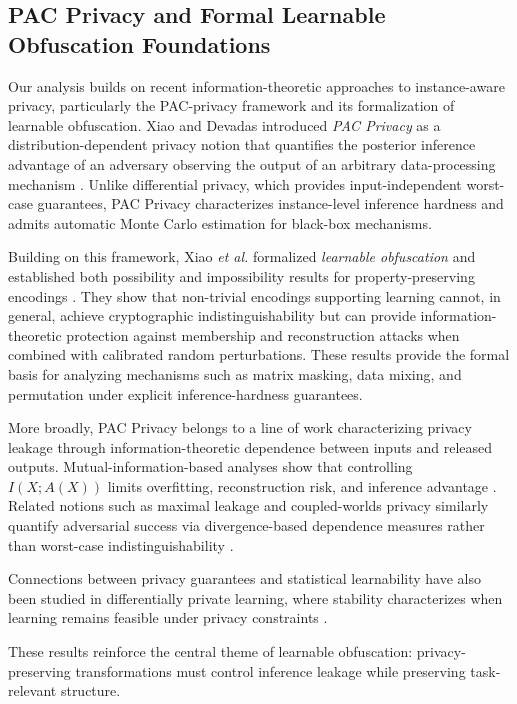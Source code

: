 \documentclass[letterpaper]{article} %
\begin{document}
\subsection{PAC Privacy and Formal Learnable Obfuscation Foundations}

Our analysis builds on recent information-theoretic approaches to instance-aware privacy, particularly the PAC-privacy framework and its formalization of learnable obfuscation. Xiao and Devadas introduced \emph{PAC Privacy} as a distribution-dependent privacy notion that quantifies the posterior inference advantage of an adversary observing the output of an arbitrary data-processing mechanism \cite{xiao2023pacprivacy}. Unlike differential privacy, which provides input-independent worst-case guarantees, PAC Privacy characterizes instance-level inference hardness and admits automatic Monte Carlo estimation for black-box mechanisms.

Building on this framework, Xiao \textit{et al.} formalized \emph{learnable obfuscation} and established both possibility and impossibility results for property-preserving encodings \cite{xiao2024formal}. They show that non-trivial encodings supporting learning cannot, in general, achieve cryptographic indistinguishability but can provide information-theoretic protection against membership and reconstruction attacks when combined with calibrated random perturbations. These results provide the formal basis for analyzing mechanisms such as matrix masking, data mixing, and permutation under explicit inference-hardness guarantees.

More broadly, PAC Privacy belongs to a line of work characterizing privacy leakage through information-theoretic dependence between inputs and released outputs. Mutual-information-based analyses show that controlling $I(X;A(X))$ limits overfitting, reconstruction risk, and inference advantage \cite{russo2016controlling,raginsky2016information,xu2017information}. Related notions such as maximal leakage and coupled-worlds privacy similarly quantify adversarial success via divergence-based dependence measures rather than worst-case indistinguishability \cite{esposito2019maximal,bassily2013coupled}.

Connections between privacy guarantees and statistical learnability have also been studied in differentially private learning, where stability characterizes when learning remains feasible under privacy constraints \cite{wang2016learning}. 

These results reinforce the central theme of learnable obfuscation: privacy-preserving transformations must control inference leakage while preserving task-relevant structure.
\end{document}
